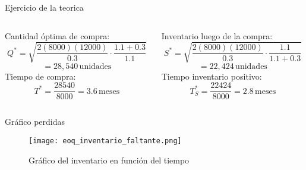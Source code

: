 \documentclass{beamer}
\begin{document}
\begin{frame}{Ejercicio de la teorica}
    
    \begin{columns}[T]
        \begin{column}{0.5\textwidth}
            \textcolor{primary}{Cantidad óptima de compra:}
            \[ Q^* = \sqrt{\frac{2(8000)(12000)}{0.3} \cdot \frac{1.1+0.3}{1.1}}  \]
            \[= 28,540\,\text{unidades}\]
            \vspace{0.5cm}
            \textcolor{primary}{Tiempo de compra:}
            \[T^* = \frac{28540}{8000}= 3.6 \,\text{meses}\]
        \end{column}
        \begin{column}{0.5\textwidth}
            \textcolor{primary}{Inventario luego de la compra:}
            \[ S^* = \sqrt{\frac{2(8000)(12000)}{0.3} \cdot \frac{1.1}{1.1+0.3}}  \]
            \[= 22,424\,\text{unidades}\]
            \vspace{0.5cm}
            \textcolor{primary}{Tiempo inventario positivo:}
            \[T_S^* = \frac{22424}{8000} = 2.8 \,\text{meses}\]
        \end{column}
    \end{columns}
\end{frame}

\begin{frame}{Gráfico perdidas}
    \begin{figure}
        \centering
        \texttt{[image: eoq\_inventario\_faltante.png]}
        \caption{Gráfico del inventario en función del tiempo}
    \end{figure}
\end{frame}
\end{document}
